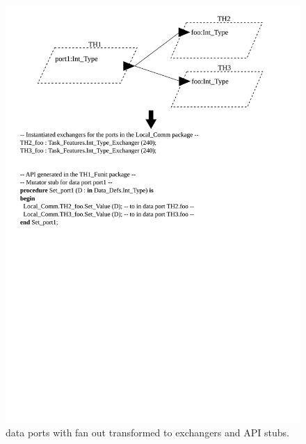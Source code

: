 \begin{figure}
\centering
\includegraphics[scale=0.5]{figs/dataports_fanout}
\caption{\aadl data ports with fan out transformed to exchangers and
  API stubs.}
\label{fig:dataports_fanout}
\end{figure}

